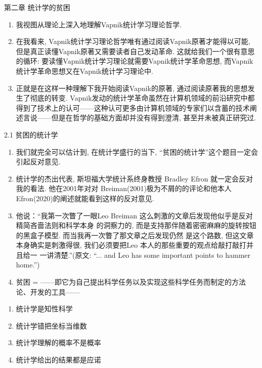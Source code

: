 \documentclass[compress,10pt,dvipsnames,notheorems]{beamer} %
\begin{document}
\begin{frame}{第二章 统计学的贫困}
\begin{solu}
\begin{enumerate}
\item 我视图从理论上深入地理解Vapnik统计学习理论哲学. 

\item 在我看来, Vapnik统计学习理论哲学唯有通过阅读Vapnik原著才能得以可能, 但是真正读懂Vapnik原著又需要读者自己发动革命. 这就给我们一个很有意思的循环: 要读懂Vapnik统计学习理论就需要Vapnik统计学革命思想, 而Vapnik统计学革命思想又在Vapnik统计学习理论中. 

\item 正就是在这样一种理解下我开始阅读Vapnik的原著, 通过阅读原著我的思想发生了彻底的转变. Vapnik发动的统计学革命虽然在计算机领域的前沿研究中都得到了技术上的认可——这种认可更多由计算机领域的专家们以含蓄的技术阐述言说——但是在哲学的基础方面却并没有得到澄清, 甚至并未被真正研究过. 
\end{enumerate}
\end{solu}

\end{frame}

\begin{frame}{2.1 贫困的统计学}
\begin{solu}
\begin{enumerate}
\item 我们就完全可以估计到, 在统计学盛行的当下, “贫困的统计学”这个题目一定会引起反对意见. 
\item 统计学的杰出代表, 斯坦福大学统计系终身教授 Bradley Efron 就一定会反对我的看法. 他在2001年对对 Breiman(2001)极为不屑的的评论和他本人Efron(2020)的阐述就能看到这样的反对意见.
\item 他说：“我第一次瞥了一眼Leo Breiman 这么刺激的文章后发现他似乎是反对精简吝啬法则和科学本身
的洞察力的, 而是支持那伴随着密密麻麻的旋转按钮的黑盒子模型. 而当我再一次瞥了那文章之后发现仍然
是这个路数, 但这文章本身确实是刺激得很, 我们必须要把Leo 本人的那些重要的观点给敲打敲打并且给一
一讲清楚.”(原文: “... and Leo has some important points to hammer home.”)
\item 贫困 = {\color{red}{统计学真正的科学性}}——即它为自己提出科学任务以及实现这些科学任务而制定的方法论、开发的工具——{\color{red}{已经成为不可能了.}}
\end{enumerate}
\pause
\begin{enumerate}
\item 统计学是知性科学
\item 统计学错把坐标当维数
\item 统计学理解的概率不是概率
\item 统计学给出的结果都是应诺
\end{enumerate}
\end{solu}
\end{frame}
\end{document}
